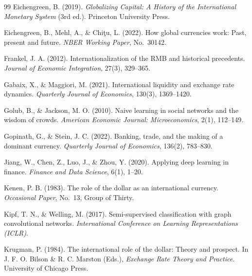 \documentclass[12pt, letterpaper]{article}
\theoremstyle{definition}
\begin{document}
\begin{thebibliography}{99}
Eichengreen, B. (2019).
\newblock \textit{Globalizing Capital: A History of the International Monetary System} (3rd ed.).
\newblock Princeton University Press.

Eichengreen, B., Mehl, A., \& Chiţu, L. (2022).
\newblock How global currencies work: Past, present and future.
\newblock \textit{NBER Working Paper}, No.~30142.

Frankel, J. A. (2012).
\newblock Internationalization of the RMB and historical precedents.
\newblock \textit{Journal of Economic Integration}, 27(3), 329--365.

Gabaix, X., \& Maggiori, M. (2021).
\newblock International liquidity and exchange rate dynamics.
\newblock \textit{Quarterly Journal of Economics}, 130(3), 1369--1420.

Golub, B., \& Jackson, M. O. (2010).
\newblock Naive learning in social networks and the wisdom of crowds.
\newblock \textit{American Economic Journal: Microeconomics}, 2(1), 112--149.

Gopinath, G., \& Stein, J. C. (2022).
\newblock Banking, trade, and the making of a dominant currency.
\newblock \textit{Quarterly Journal of Economics}, 136(2), 783--830.

Jiang, W., Chen, Z., Luo, J., \& Zhou, Y. (2020).
\newblock Applying deep learning in finance.
\newblock \textit{Finance and Data Science}, 6(1), 1--20.

Kenen, P. B. (1983).
\newblock The role of the dollar as an international currency.
\newblock \textit{Occasional Paper}, No.~13, Group of Thirty.

Kipf, T. N., \& Welling, M. (2017).
\newblock Semi-supervised classification with graph convolutional networks.
\newblock \textit{International Conference on Learning Representations (ICLR)}.

Krugman, P. (1984).
\newblock The international role of the dollar: Theory and prospect.
\newblock In J. F. O. Bilson \& R. C. Marston (Eds.), \textit{Exchange Rate Theory and Practice}. University of Chicago Press.


\end{thebibliography}
\end{document}
